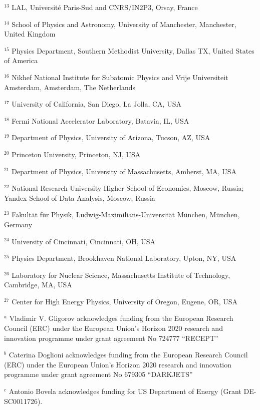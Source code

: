 \par {\footnotesize $^{13}$ LAL, Université Paris-Sud and CNRS/IN2P3, Orsay, France}
\par {\footnotesize $^{14}$ School of Physics and Astronomy, University of Manchester, Manchester, United Kingdom}
\par {\footnotesize $^{15}$ Physics Department, Southern Methodist University, Dallas TX, United States of America}
\par {\footnotesize $^{16}$ Nikhef National Institute for Subatomic Physics and Vrije Universiteit Amsterdam, Amsterdam, The Netherlands}
\par {\footnotesize $^{17}$ University of California, San Diego, La Jolla, CA, USA}
\par {\footnotesize $^{18}$ Fermi National Accelerator Laboratory, Batavia, IL, USA}
\par {\footnotesize $^{19}$ Department of Physics, University of Arizona, Tucson, AZ, USA}
\par {\footnotesize $^{20}$ Princeton University, Princeton, NJ, USA}
\par {\footnotesize $^{21}$ Department of Physics, University of Massachusetts, Amherst, MA, USA}
\par {\footnotesize $^{22}$ National Research University Higher School of Economics, Moscow, Russia;  Yandex School of Data Analysis, Moscow, Russia}
\par {\footnotesize $^{23}$ Fakult\"at f\"ur Physik, Ludwig-Maximilians-Universit\"at M\"unchen, M\"unchen, Germany}
\par {\footnotesize $^{24}$ University of Cincinnati, Cincinnati, OH, USA}
\par {\footnotesize $^{25}$ Physics Department, Brookhaven National Laboratory, Upton, NY, USA}
\par {\footnotesize $^{26}$ Laboratory for Nuclear Science, Massachusetts Institute of Technology, Cambridge, MA, USA}
\par {\footnotesize $^{27}$ Center for High Energy Physics, University of Oregon, Eugene, OR, USA}
\bigskip
\par {\footnotesize $^{a}$ Vladimir V. Gligorov acknowledges funding from the European Research Council (ERC) under the European Union's Horizon 2020 research and innovation programme under grant agreement No 724777 “RECEPT”}
\par {\footnotesize $^{b}$ Caterina Doglioni acknowledges funding from the European Research Council (ERC) under the European Union's Horizon 2020 research and innovation programme under grant agreement No 679305 “DARKJETS”}
\par {\footnotesize $^{c}$ Antonio Bovela acknowledges funding for US Department of Energy (Grant DE-SC0011726).}
